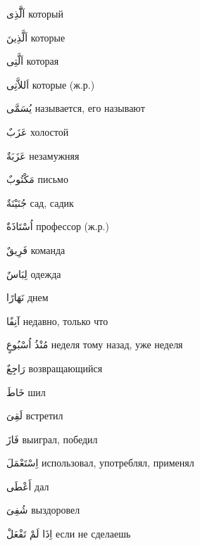 \documentclass[a5paper]{article}
\newcommand\textstyleDropCaps[1]{#1}
\newcommand\textstyleCaptioncharacters[1]{#1}
\begin{document}
\textstyleCaptioncharacters{اَلَّّذِى }\textstyleDropCaps{который‎}

\textstyleCaptioncharacters{اَلَّذِينَ }\textstyleDropCaps{которые‎}

\textstyleCaptioncharacters{اَلَّتِى }\textstyleDropCaps{которая‎}

\textstyleCaptioncharacters{اَللاَّتِى }\textstyleDropCaps{которые (ж.р.)‎}

\textstyleCaptioncharacters{يُسَمَّى }\textstyleDropCaps{называется, его на­зывают‎}

\textstyleCaptioncharacters{عَزَبٌ }\textstyleDropCaps{холостой‎}

\textstyleCaptioncharacters{عَزَبَةٌ }\textstyleDropCaps{незамужняя‎}

\textstyleCaptioncharacters{مَكْتُوبٌ }\textstyleDropCaps{письмо‎}

\textstyleCaptioncharacters{جُنَيْنَةٌ }\textstyleDropCaps{сад, садик‎}

\textstyleCaptioncharacters{اُسْتَاذَةٌ }\textstyleDropCaps{профессор (ж.р.)‎}

\textstyleCaptioncharacters{فَرِيقٌ }\textstyleDropCaps{команда‎}

\textstyleCaptioncharacters{لِبَاسٌ }\textstyleDropCaps{одежда‎}

\textstyleCaptioncharacters{نَهَارًا }\textstyleDropCaps{днем‎}

\textstyleCaptioncharacters{آنِفًا }\textstyleDropCaps{недавно, только что‎}

\textstyleCaptioncharacters{مُنْذُ اُسْبُوعٍ }\textstyleDropCaps{неделя тому назад, уже неделя‎}

\textstyleCaptioncharacters{رَاجِعٌ }\textstyleDropCaps{возвращающийся‎}

\textstyleCaptioncharacters{خَاطَ }\textstyleDropCaps{шил‎}

\textstyleCaptioncharacters{لَقِىَ }\textstyleDropCaps{встретил‎}

\textstyleCaptioncharacters{فَازَ }\textstyleDropCaps{выиграл, победил‎}

\textstyleCaptioncharacters{اِسْتَعْمَلَ }\textstyleDropCaps{использовал, употреблял, применял‎}

\textstyleCaptioncharacters{أَعْطَى }\textstyleDropCaps{дал‎}

\textstyleCaptioncharacters{شُفِىَ }\textstyleDropCaps{выздоровел‎}

\textstyleCaptioncharacters{اِذَا لَمْ تَفْعَلْ }\textstyleDropCaps{если не сде­лаешь‎}
\end{document}
